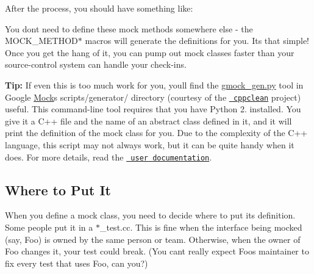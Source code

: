 After the process, you should have something like\+:


\begin{DoxyCode}{0}
\DoxyCodeLine{\};}
\end{DoxyCode}


You don\textquotesingle{}t need to define these mock methods somewhere else -\/ the {\ttfamily M\+O\+C\+K\+\_\+\+M\+E\+T\+H\+O\+D$\ast$} macros will generate the definitions for you. It\textquotesingle{}s that simple! Once you get the hang of it, you can pump out mock classes faster than your source-\/control system can handle your check-\/ins.

{\bfseries{Tip\+:}} If even this is too much work for you, you\textquotesingle{}ll find the {\ttfamily \mbox{\hyperlink{gmock__gen_8py}{gmock\+\_\+gen.\+py}}} tool in Google \mbox{\hyperlink{classMock}{Mock}}\textquotesingle{}s {\ttfamily scripts/generator/} directory (courtesy of the \href{http://code.google.com/p/cppclean/}{\texttt{ cppclean}} project) useful. This command-\/line tool requires that you have Python 2. installed. You give it a C++ file and the name of an abstract class defined in it, and it will print the definition of the mock class for you. Due to the complexity of the C++ language, this script may not always work, but it can be quite handy when it does. For more details, read the \href{../scripts/generator/README}{\texttt{ user documentation}}.

\subsection*{Where to Put It}

When you define a mock class, you need to decide where to put its definition. Some people put it in a {\ttfamily $\ast$\+\_\+test.cc}. This is fine when the interface being mocked (say, {\ttfamily Foo}) is owned by the same person or team. Otherwise, when the owner of {\ttfamily Foo} changes it, your test could break. (You can\textquotesingle{}t really expect {\ttfamily Foo}\textquotesingle{}s maintainer to fix every test that uses {\ttfamily Foo}, can you?)

